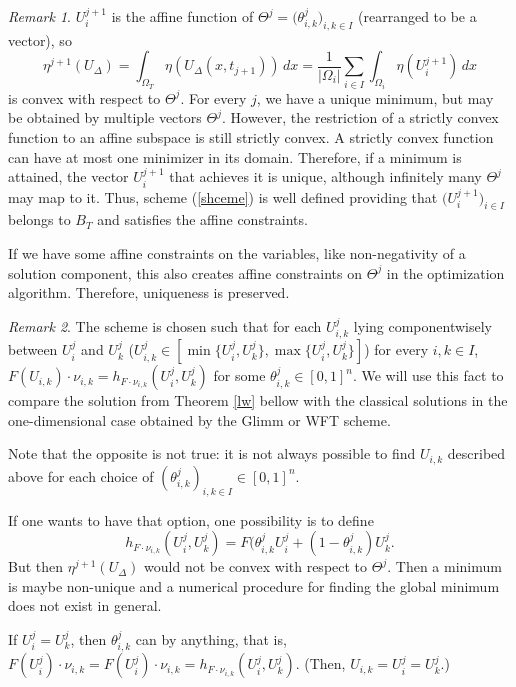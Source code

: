 \documentclass[11pt,a4paper,reqno]{amsart}
\theoremstyle{plain}
\theoremstyle{definition}
\theoremstyle{remark}
\newtheorem{remark}{Remark}[section]
\numberwithin{equation}{section}
\begin{document}
{\begin{remark}
$U_{i}^{j+1}$ is the affine function of $\Theta^{j}
=\big( \theta_{i,k}^{j}\big)_{i,k\in I}$ (rearranged to be a vector), so
\[
\eta^{j+1}(U_{\Delta})=\int_{\Omega_{T}}\eta(U_{\Delta}(x,t_{j+1}))\, dx
=\dfrac{1}{|\Omega_{i}|}\sum_{i\in I} \int_{\Omega_{i}}\eta(U_{i}^{j+1})\, dx
\]
is convex with respect to $\Theta^{j}$. For every $j$, 
we have a unique minimum, but may
be obtained by multiple vectors $\Theta^{j}$. However, the restriction of a 
strictly convex function to an affine subspace is still strictly convex. 
A strictly convex function can have at most one minimizer in its domain.
Therefore, if a minimum is attained, the vector $U_{i}^{j+1}$ that achieves it 
is unique, although infinitely many $\Theta^{j}$ may map to it.
Thus, scheme (\ref{shceme}) is well defined providing that 
$\big(U_{i}^{j+1}\big)_{i\in I}$ belongs to $B_{T}$ and satisfies the affine constraints.

If we have some affine constraints on the variables, like non-negativity of a solution component,
this also creates affine constraints on $\Theta ^{j}$ in the optimization algorithm. Therefore, uniqueness is preserved.
\end{remark}

\begin{remark} \label{rem2}
The scheme is chosen such that for each $U_{i,k}^{j}$ lying componentwisely
between 
$U_{i}^{j}$ and $U_{k}^{j}$ ($U_{i,k}^{j}\in [\min\{ U_{i}^{j},
U_{k}^{j}\},\max\{U_{i}^{j},U_{k}^{j}\}]$)
for every $i,k\in I$, $F(U_{i,k})\cdot \nu_{i,k}=h_{F\cdot \nu_{i,k}}(U_{i}^{j},U_{k}^{j})$ for some $\theta_{i,k}^{j} \in [0,1]^{n}$.
We will use this fact to compare the solution from Theorem \ref{lw} bellow
with the classical solutions in the one-dimensional case obtained by 
the Glimm or WFT scheme. 

Note that the opposite is not true: it is not always possible to find $U_{i,k}$
described above for each choice of $(\theta_{i,k}^{j})_{i,k\in I} \in [0,1]^{n}$.

If one wants to have that option, one possibility is to define
\[
h_{F \cdot \nu_{i,k}} (U_{i}^{j}, U_{k}^{j}) = F(\theta _{i, k}^{j} U_{i}^{j} + (1 - \theta _{i, k}^{j}) U_{k}^{j}.
\]
But then $\eta^{j+1} (U _{\Delta})$ would not be convex with respect to
$\Theta ^{j}$. Then a minimum is maybe non-unique and a numerical 
procedure for finding the global minimum does not exist in general.

If $U_{i}^{j}=U_{k}^{j}$, then $\theta_{i,k}^{j}$ can by anything, that is, 
$F(U_{i}^{j})\cdot \nu_{i,k}=F(U_{i}^{j})\cdot \nu_{i,k}=h_{F\cdot 
\nu_{i,k}}(U_{i}^{j},U_{k}^{j})$. (Then, $U_{i,k}=U_{i}^{j}=U_{k}^{j}$.)
\end{remark}

}
\end{document}
